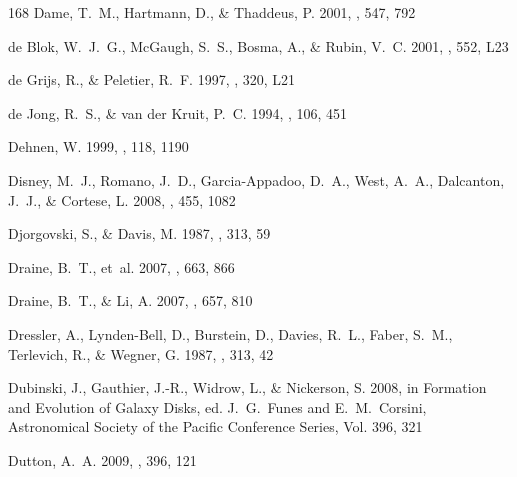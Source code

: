 \documentclass[apj,iop,numberedappendix]{emulateapj}
\begin{document}
\begin{thebibliography}{168}
{Dame}, T.~M., {Hartmann}, D., \& {Thaddeus}, P. 2001, \apj, 547, 792

{de Blok}, W.~J.~G., {McGaugh}, S.~S., {Bosma}, A., \& {Rubin}, V.~C. 2001,
  \apjl, 552, L23

{de Grijs}, R., \& {Peletier}, R.~F. 1997, \aap, 320, L21

{de Jong}, R.~S., \& {van der Kruit}, P.~C. 1994, \aaps, 106, 451

{Dehnen}, W. 1999, \aj, 118, 1190

{Disney}, M.~J., {Romano}, J.~D., {Garcia-Appadoo}, D.~A., {West}, A.~A.,
  {Dalcanton}, J.~J., \& {Cortese}, L. 2008, \nat, 455, 1082

{Djorgovski}, S., \& {Davis}, M. 1987, \apj, 313, 59

{Draine}, B.~T., {et~al.} 2007, \apj, 663, 866

{Draine}, B.~T., \& {Li}, A. 2007, \apj, 657, 810

{Dressler}, A., {Lynden-Bell}, D., {Burstein}, D., {Davies}, R.~L., {Faber},
  S.~M., {Terlevich}, R., \& {Wegner}, G. 1987, \apj, 313, 42

{Dubinski}, J., {Gauthier}, J.-R., {Widrow}, L., \& {Nickerson}, S. 2008, in
  Formation and Evolution of Galaxy Disks, ed. J.~G.\ Funes and E.~M.\ Corsini,
  Astronomical Society of the Pacific Conference Series, Vol. 396, 321

{Dutton}, A.~A. 2009, \mnras, 396, 121


\end{thebibliography}
\end{document}
